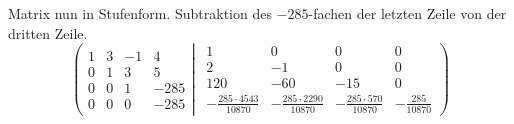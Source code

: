\documentclass[a4paper,german,12pt,smallheadings]{scrartcl}
\begin{document}
Matrix nun in Stufenform. Subtraktion des $-285$-fachen der letzten Zeile von der dritten Zeile.
\begin{equation*}
\left(
 \begin{matrix}
 1 & 3 & -1 & 4 \\
 0 & 1 & 3 & 5 \\
 0 & 0 & 1 & -285 \\
 0 & 0 & 0 & -285
 \end{matrix}
 \left|
  \hspace{5pt}
  \begin{matrix}
  1 & 0 & 0 & 0 \\
  2 & -1 & 0 & 0 \\
  120 & -60 & -15 & 0 \\
  -\frac{285\cdot4543}{10870} & -\frac{285\cdot2290}{10870} & -\frac{285\cdot570}{10870} & -\frac{285}{10870}
  \end{matrix}
 \right)
\right.
\end{equation*}
\end{document}

